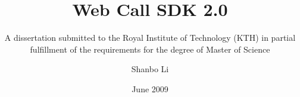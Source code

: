 \title{Web Call SDK 2.0}
\subtitle{A dissertation submitted to
          the Royal Institute of Technology (KTH)
          in partial fulfillment of the requirements for
          the degree of Master of Science}
\author{Shanbo Li}
\date{June 2009}
